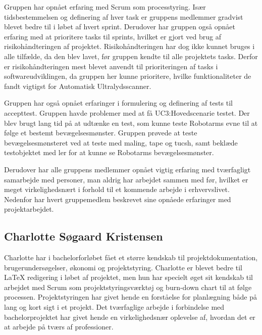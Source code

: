Gruppen har opnået erfaring med Scrum som processtyring. Især tidsbestemmelsen og definering af hver task er gruppens medlemmer gradvist blevet bedre til i løbet af hvert sprint. Derudover har gruppen også opnået erfaring med at prioritere tasks til sprints, hvilket er gjort ved brug af risikohåndteringen af projektet. Risikohåndteringen har dog ikke kunnet bruges i alle tilfælde, da den blev lavet, før gruppen kendte til alle projektets tasks. Derfor er risikohåndteringen mest blevet anvendt til prioriteringen af tasks i softwareudviklingen, da gruppen her kunne prioritere, hvilke funktionaliteter de fandt vigtigst for Automatisk Ultralydsscanner. 

Gruppen har også opnået erfaringer i formulering og definering af tests til accepttest. Gruppen havde problemer med at få UC3:Hovedscenarie testet. Der blev brugt lang tid på at udtænke en test, som kunne teste Robotarms evne til at følge et bestemt bevægelsesmønster. Gruppen prøvede at teste bevægelsesmønsteret ved at teste med maling, tape og tucsh, samt beklæde testobjektet med ler for at kunne se Robotarms bevægelsesmønster. 

Derudover har alle gruppens medlemmer opnået vigtig erfaring med tværfagligt samarbejde med personer, man aldrig har arbejdet sammen med før, hvilket er meget virkelighedsnært i forhold til et kommende arbejde i erhvervslivet.
Nedenfor har hvert gruppemedlem beskrevet sine opnåede erfaringer med projektarbejdet. 

\subsection{Charlotte Søgaard Kristensen}
Charlotte har i bachelorforløbet fået et større kendskab til projektdokumentation, brugerundersøgelser, økonomi og projektstyring. Charlotte er blevet bedre til LaTeX redigering i løbet af projektet, men hun har specielt øget sit kendskab til arbejdet med Scrum som projektstyringsværktøj og burn-down chart til at følge processen. Projektstyringen har givet hende en forståelse for planlægning både på lang og kort sigt i et projekt. Det tværfaglige arbejde i forbindelse med bachelorprojektet har givet hende en virkelighedsnær oplevelse af, hvordan det er at arbejde på tværs af professioner. 

